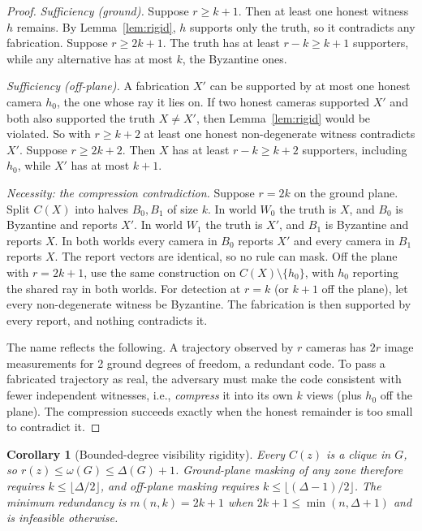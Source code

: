 \documentclass[journal]{IEEEtran}
\newtheorem{corollary}{Corollary}
\theoremstyle{remark}
\begin{document}
\begin{proof}
\emph{Sufficiency (ground).} Suppose $r\ge k{+}1$. Then at least one honest witness $h$ remains. By
Lemma~\ref{lem:rigid}, $h$ supports only the truth, so it contradicts any fabrication. Suppose $r\ge 2k{+}1$. The truth
has at least $r-k\ge k{+}1$ supporters, while any alternative has at most $k$, the Byzantine ones.

\emph{Sufficiency (off-plane).} A fabrication $X'$ can be supported by at most one honest camera $h_0$, the one whose
ray it lies on. If two honest cameras supported $X'$ and both also supported the truth $X\neq X'$, then
Lemma~\ref{lem:rigid} would be violated. So with $r\ge k{+}2$ at least one honest non-degenerate witness contradicts
$X'$. Suppose $r\ge 2k{+}2$. Then $X$ has at least $r-k\ge k{+}2$ supporters, including $h_0$, while $X'$ has at most
$k{+}1$.

\emph{Necessity: the compression contradiction.} Suppose $r=2k$ on the ground plane. Split $C(X)$ into halves $B_0,B_1$
of size $k$. In world $W_0$ the truth is $X$, and $B_0$ is Byzantine and reports $X'$. In world $W_1$ the truth is $X'$,
and $B_1$ is Byzantine and reports $X$. In both worlds every camera in $B_0$ reports $X'$ and every camera in $B_1$
reports $X$. The report vectors are identical, so no rule can mask. Off the plane with $r=2k{+}1$, use the same
construction on $C(X)\setminus\{h_0\}$, with $h_0$ reporting the shared ray in both worlds. For detection at $r=k$ (or
$k{+}1$ off the plane), let every non-degenerate witness be Byzantine. The fabrication is then supported by every
report, and nothing contradicts it.

The name reflects the following. A trajectory observed by $r$ cameras has $2r$ image measurements for 2 ground degrees
of freedom, a redundant code. To pass a fabricated trajectory as real, the adversary must make the code consistent
with fewer independent witnesses, i.e., \emph{compress} it into its own $k$ views (plus $h_0$ off the plane). The
compression succeeds exactly when the honest remainder is too small to contradict it.
\end{proof}

\begin{corollary}[Bounded-degree visibility rigidity]\label{cor:degree}
Every $C(z)$ is a clique in $G$, so $r(z)\le\omega(G)\le\Delta(G)+1$. Ground-plane masking of any zone therefore
requires $k\le\lfloor\Delta/2\rfloor$, and off-plane masking requires $k\le\lfloor(\Delta-1)/2\rfloor$. The minimum
redundancy is $m(n,k)=2k{+}1$ when $2k{+}1\le\min(n,\Delta{+}1)$ and is infeasible otherwise.
\end{corollary}
\end{document}
